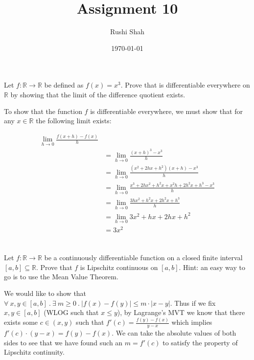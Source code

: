 \documentclass[]{article}
\author{Rushi Shah}
\date{\today}
\title{Assignment 10}
\newcommand{\reals}{\mathbb{R}}
\begin{document}
	\maketitle

	\section{}
		\begin{em}
			Let $f : \reals \to \reals$ be defined as $f(x) = x^3$. Prove that is differentiable everywhere on $\reals$ by showing that the limit of the difference quotient exists.
		\end{em}

		To show that the function $f$ is differentiable everywhere, we must show that for any $x \in \reals$ the following limit exists:

		\begin{align*}
			\lim_{h \to 0}\frac{f(x + h) - f(x)}{h} \\
			&=\lim_{h \to 0}\frac{(x + h)^3 - x^3}{h} \\
			&=\lim_{h \to 0}\frac{(x^2 + 2hx + h^2)(x + h) - x^3}{h} \\
			&=\lim_{h \to 0}\frac{x^3 + 2hx^2 + h^2x + x^2h + 2h^2x + h^3 - x^3}{h} \\
 			&=\lim_{h \to 0}\frac{3hx^2 + h^2x + 2h^2x + h^3}{h} \\
			&=\lim_{h \to 0}{3x^2 + hx + 2hx + h^2} \\
			&=3x^2
		\end{align*}

	\section{}
		\begin{em}
			Let $f : \reals \to \reals$ be a continuously differentiable function on a closed finite interval $[a, b] \subseteq \reals$. Prove that $f$ is Lipschitz continuous on $[a, b]$. Hint: an easy way to go is to use the Mean Value Theorem.
		\end{em}

		We would like to show that $\forall\ x, y \in [a, b]\ .\ \exists\ m \geq 0\ .\ |f(x) - f(y)| \leq m \cdot |x - y|$. Thus if we fix $x, y \in [a, b]$ (WLOG such that $x \leq y$), by Lagrange's MVT we know that there exists some $c \in (x, y)$ such that $f'(c) = \frac{f(y) - f(x)}{y - x}$ which implies $f'(c) \cdot (y - x) = f(y) - f(x)$. We can take the absolute values of both sides to see that we have found such an $m = f'(c)$ to satisfy the property of Lipschitz continuity.
\end{document}

